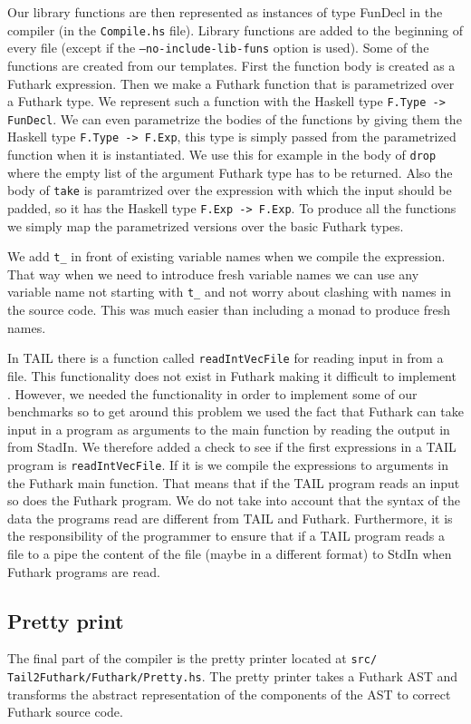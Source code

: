 \documentclass[11pt]{article}
\begin{document}
Our library functions are then represented as instances of type FunDecl in the compiler (in the {\tt Compile.hs} file).
Library functions are added to the beginning of every file (except if the {\tt --no-include-lib-funs} option is used). 
Some of the functions are created from our templates. First the function body is created as a Futhark expression.
Then we make a Futhark function that is parametrized over a Futhark type. We represent such a function with the Haskell type {\tt F.Type -> FunDecl}.
We can even parametrize the bodies of the functions by giving them the Haskell type {\tt F.Type -> F.Exp},
this type is simply passed from the parametrized function when it is instantiated.
We use this for example in the body of {\tt drop} where the empty list of the argument Futhark type has to be returned.
Also the body of {\tt take} is paramtrized over the expression with which the input should be padded, so it has the Haskell type {\tt F.Exp -> F.Exp}.
To produce all the functions we simply map the parametrized versions over the basic Futhark types. 

We add {\tt t\_} in front of existing variable names when we compile the expression. That way when we need to introduce fresh variable names we can use any variable name not starting with {\tt t\_} and not worry about clashing with names in the source code. This was much easier than including a monad to produce fresh names. 

In TAIL there is a function called {\tt readIntVecFile} for reading input in from a file.
This functionality does not exist in Futhark making it difficult to implement\cite{ElsmanDybdal:Array:2014} \cite{TroelsHenriksen}.
However, we needed the functionality in order to implement some of our benchmarks so to get around this problem we used the fact
that Futhark can take input in a program as arguments to the main function by reading the output in from StadIn\cite{TroelsHenriksen}.
We therefore added a check to see if the first expressions in a TAIL program is {\tt readIntVecFile}.
If it is we compile the expressions to arguments in the Futhark main function. That means that if the TAIL program reads an input so does the Futhark program. 
We do not take into account that the syntax of the data the programs read are different from TAIL and Futhark.
Furthermore, it is the responsibility of the programmer to ensure that if a TAIL program reads a file to a pipe the content of the file (maybe in a different format) to StdIn when Futhark programs are read. 

\subsection{Pretty print}
The final part of the compiler is the pretty printer located at {\tt src/
Tail2Futhark/Futhark/Pretty.hs}. 
The pretty printer takes a Futhark AST and transforms the abstract representation of the components of the AST to correct Futhark source code. 
\end{document}
